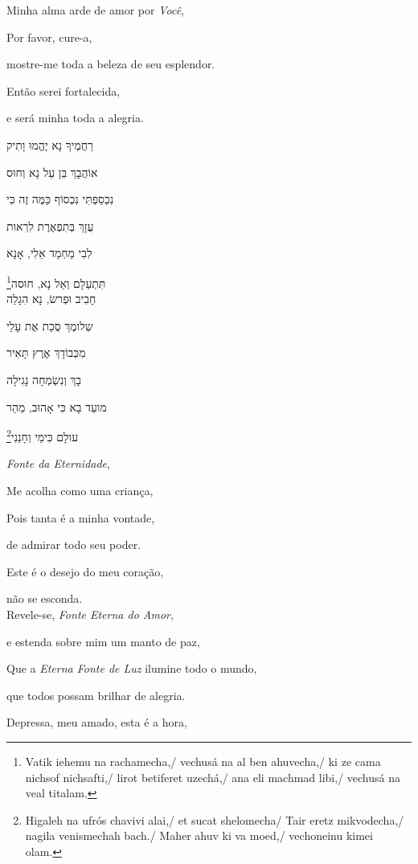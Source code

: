 Minha alma arde de amor por \emph{Você},

Por favor, cure-a,

mostre-me toda a beleza de seu esplendor.

Então serei fortalecida,

e será minha toda a alegria.\\[10pt]

\movetoevenpage
\raggedleft

רַחֲמֶיךָ נָא יֶהֱמוּ וָתִיק 

אוֹהֲבָךְ בֵּן עַל נָא וְחוּס 

נִכְסַפְתִּי נִכְסוֹף כַּמֶּה זֶה כִּי 

עֻזָךְ בְּתִפְאֶרֶת לִרְאות 

לִבִי מַחְמָד אֵלִי, אָנָא 

תִּתְעַלָם וְאַל נָא, חוּסה\footnote{Vatik iehemu na rachamecha,/
vechusá na al ben ahuvecha,/ ki ze cama nichsof nichsafti,/ lirot betiferet uzechá,/
ana eli machmad libi,/ vechusá na veal titalam.}\\[10pt]

חָבִיב וּפְרשׂ, נָא הִגָלֵה

שְלומֶךְ סֻכַת אֶת עָלַי 

מִכְּבוֹדָךְ אֶרֶץ תָּאִיר 

בָךְ וְנִשְׂמְחָה נָגִילָה 

מועֵד בָא כִּי אָהוּב, מַהֵר

עולָם כִּימֵי וְחָנֵנִי\footnote{
Higaleh na ufrós chavivi alai,/
et sucat shelomecha/ Tair eretz mikvodecha,/ nagila venismechah bach./ Maher ahuv ki va moed,/
vechoneinu kimei olam.}

\movetooddpage
\raggedright

\emph{Fonte da Eternidade},

Me acolha como uma criança,

Pois tanta é a minha vontade,

de admirar todo seu poder.

Este é o desejo do meu coração,

não se esconda.\\[10pt]

Revele-se, \emph{Fonte Eterna do Amor},

e estenda sobre mim um manto de paz,

Que a \emph{Eterna Fonte de Luz} ilumine todo o mundo,

que todos possam brilhar de alegria.

Depressa, meu amado, esta é a hora,

